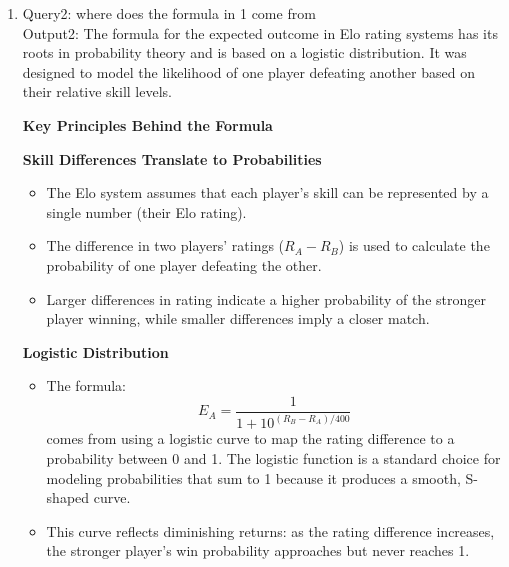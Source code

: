 \begin{enumerate}
\textbf{Example Calculation}

\textbf{Scenario:}
\begin{itemize}
    \item Player $A$: $R_A = 1600$
    \item Player $B$: $R_B = 1400$
    \item $K = 32$
    \item Player $A$ wins ($S_A = 1$, $S_B = 0$)
\end{itemize}

\textbf{Step 1: Expected Scores}
\[
E_A = \frac{1}{1 + 10^{\frac{1400 - 1600}{400}}} = \frac{1}{1 + 10^{-0.5}} \approx 0.76
\]
\[
E_B = 1 - E_A = 0.24
\]

\textbf{Step 2: Elo Updates}
\[
R_A' = 1600 + 32 \cdot (1 - 0.76) = 1600 + 7.68 \approx 1608
\]
\[
R_B' = 1400 + 32 \cdot (0 - 0.24) = 1400 - 7.68 \approx 1392
\]

\textbf{Results:}
\begin{itemize}
    \item Player $A$'s new rating: $R_A' \approx 1608$
    \item Player $B$'s new rating: $R_B' \approx 1392$
\end{itemize}

\item
Query2: where does the formula in 1 come from \\
Output2: The formula for the expected outcome in Elo rating systems has its roots in probability theory and is based on a logistic distribution. It was designed to model the likelihood of one player defeating another based on their relative skill levels.

\textbf{Key Principles Behind the Formula}

\textbf{Skill Differences Translate to Probabilities}
\begin{itemize}
    \item The Elo system assumes that each player's skill can be represented by a single number (their Elo rating).
    \item The difference in two players' ratings ($R_A - R_B$) is used to calculate the probability of one player defeating the other.
    \item Larger differences in rating indicate a higher probability of the stronger player winning, while smaller differences imply a closer match.
\end{itemize}

\textbf{Logistic Distribution}
\begin{itemize}
    \item The formula:
    \[
    E_A = \frac{1}{1 + 10^{(R_B - R_A)/400}}
    \]
    comes from using a logistic curve to map the rating difference to a probability between 0 and 1. The logistic function is a standard choice for modeling probabilities that sum to 1 because it produces a smooth, S-shaped curve.
    \item This curve reflects diminishing returns: as the rating difference increases, the stronger player’s win probability approaches but never reaches 1.
\end{itemize}


\end{enumerate}
